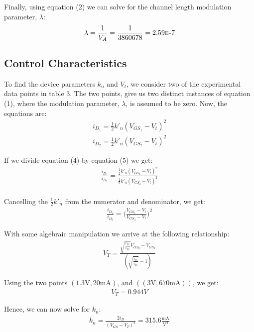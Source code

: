 \documentclass{article}
\begin{document}
Finally, using equation (2) we can solve for the channel length modulation parameter, $\lambda$:
\begin{align*}
\lambda = \frac{1}{V_A} = \frac{1}{3860678} = 2.59\mbox{\sc{e}-}7
\end{align*}

\subsection{Control Characteristics}
To find the device parameters $k_n$ and $V_t$, we consider two of the experimental data points in table 3. The two points, give us two distinct instances of equation (1), where the modulation parameter, $\lambda$, is assumed to be zero. Now, the equations are:
\begin{align}
i_{D_1} = \frac{1}{2}k'_n(V_{GS_1} - V_t)^2\\
i_{D_2} = \frac{1}{2}k'_n(V_{GS_2} - V_t)^2
\end{align}

If we divide equation (4) by equation (5) we get:
\begin{align*}
\frac{i_{D_1}}{i_{D_2}} = \frac{\frac{1}{2}k'_n(V_{GS_1} - V_t)^2}{\frac{1}{2}k'_n(V_{GS_2} - V_t)^2}\\
\end{align*}

Cancelling the $\frac{1}{2}k'_n$ from the numerator and denominator, we get:
\begin{align*}
\frac{i_{D_1}}{i_{D_2}} = \bigg(\frac{V_{GS_1} - V_t}{V_{GS_2} - V_t}\bigg)^2
\end{align*}

With some algebraic manipulation we arrive at the following relationship:
\begin{align*}
V_T = \frac{\sqrt{\frac{i_{D_1}}{i_{D_2}}}V_{GS_2} - V_{GS_1}}{(\sqrt{\frac{i_{D_1}}{i_{D_2}}} - 1)}
\end{align*}

Using the two points $(1.3\si{\volt}, 20\si{\milli \ampere})$, and $((3\si{\volt}, 670\si{\milli \ampere}))$, we get:
\begin{align*}
V_T = 0.944V
\end{align*}

Hence, we can now solve for $k_n$:
\begin{align*}
k_n = \frac{2i_D}{(V_{GS} - V_T)^2} = 315.6\frac{\si{\milli \ampere}}{\si{\volt}^2}
\end{align*}

\end{document}
